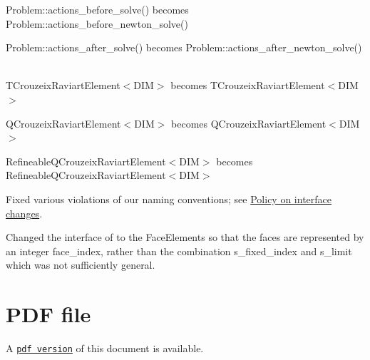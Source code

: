 \begin{DoxyItemize}
\item {\ttfamily Problem\+::actions\+\_\+before\+\_\+solve()} becomes {\ttfamily Problem\+::actions\+\_\+before\+\_\+newton\+\_\+solve()} ~\newline
~\newline

\item {\ttfamily Problem\+::actions\+\_\+after\+\_\+solve()} becomes {\ttfamily Problem\+::actions\+\_\+after\+\_\+newton\+\_\+solve()} ~\newline
~\newline

\item {\ttfamily T\+Crouzeix\+Raviart\+Element$<$\+D\+I\+M$>$} becomes {\ttfamily T\+Crouzeix\+Raviart\+Element$<$\+D\+I\+M$>$} ~\newline
~\newline

\item {\ttfamily Q\+Crouzeix\+Raviart\+Element$<$\+D\+I\+M$>$} becomes {\ttfamily Q\+Crouzeix\+Raviart\+Element$<$\+D\+I\+M$>$} ~\newline
~\newline

\item {\ttfamily Refineable\+Q\+Crouzeix\+Raviart\+Element$<$\+D\+I\+M$>$} becomes {\ttfamily Refineable\+Q\+Crouzeix\+Raviart\+Element$<$\+D\+I\+M$>$} ~\newline
~\newline

\item Fixed various violations of our naming conventions; see \hyperlink{index_interface_changes}{Policy on interface changes}. ~\newline
~\newline

\item Changed the interface of to the {\ttfamily Face\+Elements} so that the faces are represented by an integer {\ttfamily face\+\_\+index}, rather than the combination {\ttfamily s\+\_\+fixed\+\_\+index} and {\ttfamily s\+\_\+limit} which was not sufficiently general.
\end{DoxyItemize}

 

 \hypertarget{index_pdf}{}\section{P\+D\+F file}\label{index_pdf}
A \href{../latex/refman.pdf}{\tt pdf version} of this document is available. 

